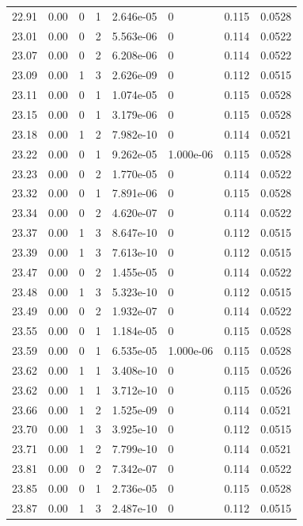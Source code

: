 \documentclass[preview]{standalone}
\begin{document}
{{{{{{{{{\begin{tabular}{L{1.2cm}C{1.2cm} C{0.3cm}C{0.5cm} C{1.4cm}C{1.4cm} C{1.4cm}C{1.4cm}}
  22.91  &  0.00  & 0     &  1 &  2.646e-05  & 0  & 0.115 &  0.0528   \\ 
  23.01  &  0.00  & 0     &  2 &  5.563e-06  & 0  & 0.114 &  0.0522   \\ 
  23.07  &  0.00  & 0     &  2 &  6.208e-06  & 0  & 0.114 &  0.0522   \\ 
  23.09  &  0.00  & 1     &  3 &  2.626e-09  & 0  & 0.112 &  0.0515   \\ 
  23.11  &  0.00  & 0     &  1 &  1.074e-05  & 0  & 0.115 &  0.0528   \\ 
  23.15  &  0.00  & 0     &  1 &  3.179e-06  & 0  & 0.115 &  0.0528   \\ 
  23.18  &  0.00  & 1     &  2 &  7.982e-10  & 0  & 0.114 &  0.0521   \\ 
  23.22  &  0.00  & 0     &  1 &  9.262e-05  & 1.000e-06  & 0.115 &  0.0528   \\ 
  23.23  &  0.00  & 0     &  2 &  1.770e-05  & 0  & 0.114 &  0.0522   \\ 
  23.32  &  0.00  & 0     &  1 &  7.891e-06  & 0  & 0.115 &  0.0528   \\ 
  23.34  &  0.00  & 0     &  2 &  4.620e-07  & 0  & 0.114 &  0.0522   \\ 
  23.37  &  0.00  & 1     &  3 &  8.647e-10  & 0  & 0.112 &  0.0515   \\ 
  23.39  &  0.00  & 1     &  3 &  7.613e-10  & 0  & 0.112 &  0.0515   \\ 
  23.47  &  0.00  & 0     &  2 &  1.455e-05  & 0  & 0.114 &  0.0522   \\ 
  23.48  &  0.00  & 1     &  3 &  5.323e-10  & 0  & 0.112 &  0.0515   \\ 
  23.49  &  0.00  & 0     &  2 &  1.932e-07  & 0  & 0.114 &  0.0522   \\ 
  23.55  &  0.00  & 0     &  1 &  1.184e-05  & 0  & 0.115 &  0.0528   \\ 
  23.59  &  0.00  & 0     &  1 &  6.535e-05  & 1.000e-06  & 0.115 &  0.0528   \\ 
  23.62  &  0.00  & 1     &  1 &  3.408e-10  & 0  & 0.115 &  0.0526   \\ 
  23.62  &  0.00  & 1     &  1 &  3.712e-10  & 0  & 0.115 &  0.0526   \\ 
  23.66  &  0.00  & 1     &  2 &  1.525e-09  & 0  & 0.114 &  0.0521   \\ 
  23.70  &  0.00  & 1     &  3 &  3.925e-10  & 0  & 0.112 &  0.0515   \\ 
  23.71  &  0.00  & 1     &  2 &  7.799e-10  & 0  & 0.114 &  0.0521   \\ 
  23.81  &  0.00  & 0     &  2 &  7.342e-07  & 0  & 0.114 &  0.0522   \\ 
  23.85  &  0.00  & 0     &  1 &  2.736e-05  & 0  & 0.115 &  0.0528   \\ 
  23.87  &  0.00  & 1     &  3 &  2.487e-10  & 0  & 0.112 &  0.0515   \\ 
\hline 
\end{tabular} 

}}}}}}}}}
\end{document}

